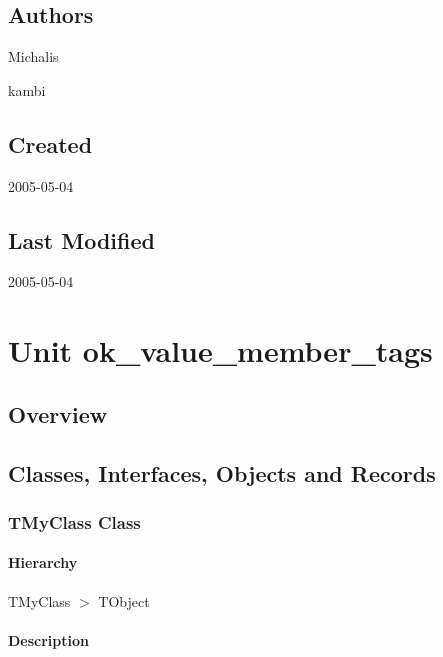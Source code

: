 \documentclass{report}
\begin{document}
\section{Authors}
\par
Michalis

\par
kambi

\section{Created}
\par
2005{-}05{-}04


\section{Last Modified}
\par
2005{-}05{-}04


\chapter{Unit ok{\_}value{\_}member{\_}tags}
\section{Overview}
\begin{description}
\item[\texttt{\begin{ttfamily}TMyClass\end{ttfamily} Class}]
\item[\texttt{\begin{ttfamily}TMyRecord\end{ttfamily} Record}]
\end{description}
\section{Classes, Interfaces, Objects and Records}
\subsection*{TMyClass Class}
\subsubsection*{\large{\textbf{Hierarchy}}\normalsize\hspace{1ex}\hfill}
TMyClass {$>$} TObject
\subsubsection*{\large{\textbf{Description}}\normalsize\hspace{1ex}\hfill}
\end{document}
